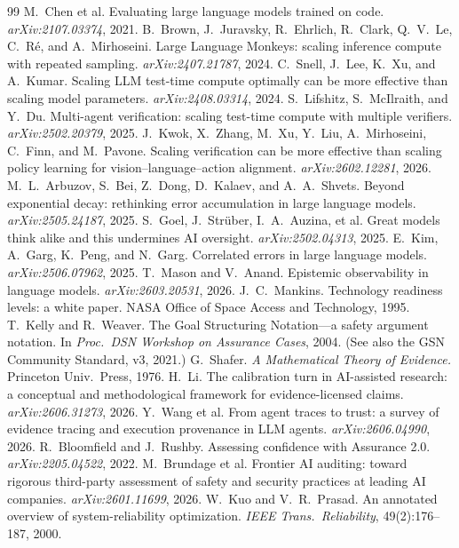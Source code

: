 \documentclass[11pt]{article}
\theoremstyle{definition}
\theoremstyle{remark}
\begin{document}
\begin{thebibliography}{99}
 M.~Chen et al. Evaluating large language models trained on code.
\emph{arXiv:2107.03374}, 2021.
 B.~Brown, J.~Juravsky, R.~Ehrlich, R.~Clark, Q.~V.~Le, C.~R\'e, and A.~Mirhoseini.
Large Language Monkeys: scaling inference compute with repeated sampling. \emph{arXiv:2407.21787}, 2024.
 C.~Snell, J.~Lee, K.~Xu, and A.~Kumar. Scaling LLM test-time compute optimally can
be more effective than scaling model parameters. \emph{arXiv:2408.03314}, 2024.
 S.~Lifshitz, S.~McIlraith, and Y.~Du. Multi-agent verification: scaling test-time
compute with multiple verifiers. \emph{arXiv:2502.20379}, 2025.
 J.~Kwok, X.~Zhang, M.~Xu, Y.~Liu, A.~Mirhoseini, C.~Finn, and M.~Pavone.
Scaling verification can be more effective than scaling policy learning for vision--language--action
alignment. \emph{arXiv:2602.12281}, 2026.
 M.~L.~Arbuzov, S.~Bei, Z.~Dong, D.~Kalaev, and A.~A.~Shvets. Beyond exponential
decay: rethinking error accumulation in large language models. \emph{arXiv:2505.24187}, 2025.
 S.~Goel, J.~Str\"uber, I.~A.~Auzina, et al. Great models think alike and this
undermines AI oversight. \emph{arXiv:2502.04313}, 2025.
 E.~Kim, A.~Garg, K.~Peng, and N.~Garg. Correlated errors in large language models.
\emph{arXiv:2506.07962}, 2025.
 T.~Mason and V.~Anand. Epistemic observability in language models.
\emph{arXiv:2603.20531}, 2026.
 J.~C.~Mankins. Technology readiness levels: a white paper. NASA Office of Space
Access and Technology, 1995.
 T.~Kelly and R.~Weaver. The Goal Structuring Notation---a safety argument notation. In
\emph{Proc.\ DSN Workshop on Assurance Cases}, 2004. (See also the GSN Community Standard, v3, 2021.)
 G.~Shafer. \emph{A Mathematical Theory of Evidence.} Princeton Univ.\ Press, 1976.
 H.~Li. The calibration turn in AI-assisted research: a conceptual and methodological
framework for evidence-licensed claims. \emph{arXiv:2606.31273}, 2026.
 Y.~Wang et al. From agent traces to trust: a survey of evidence tracing and
execution provenance in LLM agents. \emph{arXiv:2606.04990}, 2026.
 R.~Bloomfield and J.~Rushby. Assessing confidence with Assurance 2.0.
\emph{arXiv:2205.04522}, 2022.
 M.~Brundage et al. Frontier AI auditing: toward rigorous third-party assessment of
safety and security practices at leading AI companies. \emph{arXiv:2601.11699}, 2026.
 W.~Kuo and V.~R.~Prasad. An annotated overview of system-reliability optimization.
\emph{IEEE Trans.\ Reliability}, 49(2):176--187, 2000.
\end{thebibliography}
\end{document}

